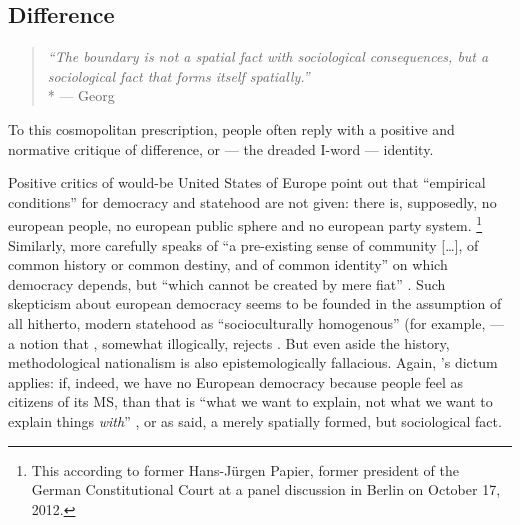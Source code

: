\subsection[Difference]{Difference} \label{sec:ID-Difference}

\begin{quote}
	\emph{``The boundary is not a spatial fact with sociological consequences, but a sociological fact that forms itself spatially.''}
	\\*
	--- Georg \citet[142]{Simmel1903}
\end{quote}

To this cosmopolitan prescription, people often reply with a positive and normative critique of difference, or --- the dreaded I-word --- identity.

Positive critics of would-be United States of Europe point out that ``empirical conditions'' for democracy and statehood are not given:
there is, supposedly, no european people, no european public sphere and no european party system.
\footnote{
	This according to former Hans-Jürgen Papier, former president of the German Constitutional Court at a panel discussion in Berlin on October 17, 2012.
}
Similarly, \citeauthor{Scharpf1997} more carefully 	speaks of ``a pre-existing sense of community [\ldots], of common history or common destiny, and of common identity'' on which democracy depends, but ``which cannot be created by mere fiat'' \citeyearpar[20]{Scharpf1997}.
Such skepticism about european democracy seems to be founded in the assumption of all hitherto, modern statehood as ``socioculturally homogenous'' (for example, \citealt[93]{BeckGrande-2007-aa} --- a notion that \citeauthor{Scharpf1997}, somewhat illogically, rejects \citeyearpar[20]{Scharpf1997}.
But even aside the history, methodological nationalism is also epistemologically fallacious.
Again, \citeauthor{Brubaker-2002-aa}'s dictum applies:
if, indeed, we have no European democracy because people feel as citizens of its \gls{MS}, than that is ``what we want to explain, not what we want to explain things \emph{with}'' \citeyearpar[165, emphasis in original]{Brubaker-2002-aa}, or as \citeauthor{Simmel1903} said, a merely spatially formed, but sociological fact.


